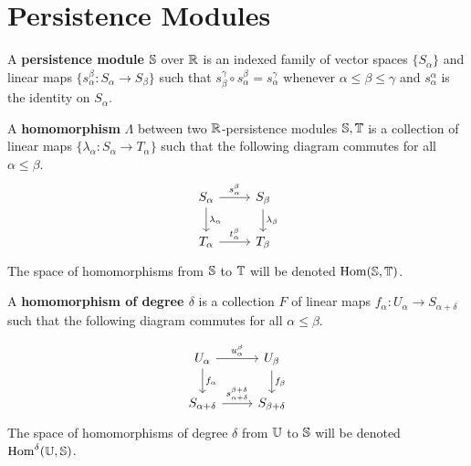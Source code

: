 
\section{Persistence Modules}

\begin{definition}
  A \textbf{persistence module} $\S$ over $\R$ is an indexed family of vector spaces $\{S_\alpha\}$ and linear maps $\{s_\alpha^\beta : S_\alpha\to S_\beta\}$ such that $s^\gamma_\beta\circ s_\alpha^\beta = s_\alpha^\gamma$ whenever $\alpha\leq\beta\leq\gamma$ and $s_\alpha^\alpha$ is the identity on $S_\alpha$.
\end{definition}

\begin{definition}
  A \textbf{homomorphism} $\Lambda$ between two $\R$-persistence modules $\S, \T$ is a collection of linear maps $\{\lambda_\alpha : S_\alpha\to T_\alpha\}$ such that the following diagram commutes for all $\alpha\leq\beta$.
  \begin{equation}\label{dgm:homomorphism}
    \begin{tikzcd}
      S_\alpha\arrow{r}{s_\alpha^\beta}\arrow{d}{\lambda_\alpha} &
      S_\beta\arrow{d}{\lambda_\beta}\\
      T_\alpha\arrow{r}{t_\alpha^\beta} &
      T_\beta
  \end{tikzcd}\end{equation}
  The space of homomorphisms from $\S$ to $\T$ will be denoted $\Hom(\S, \T)$.
\end{definition}

\begin{definition}
  A \textbf{homomorphism of degree $\delta$} is a collection $F$ of linear maps $f_\alpha : U_\alpha\to S_{\alpha+\delta}$ such that the following diagram commutes for all $\alpha\leq\beta$.

  \begin{equation}\label{dgm:shifted_homomorphism}
    \begin{tikzcd}
      U_\alpha\arrow{r}{u_\alpha^\beta}\arrow{d}{f_\alpha} &
      U_\beta\arrow{d}{f_\beta}\\
      S_{\alpha+\delta}\arrow{r}{s_{\alpha+\delta}^{\beta+\delta}} &
      S_{\beta +\delta}
  \end{tikzcd}\end{equation}
  The space of homomorphisms of degree $\delta$ from $\U$ to $\S$ will be denoted $\Hom^\delta(\U, \S)$.
\end{definition}

